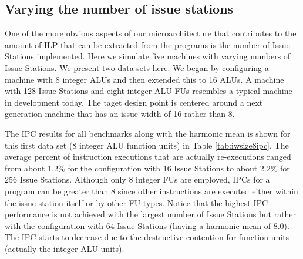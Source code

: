 %
\subsection{Varying the number of issue stations}
%
One of the more obvious aspects of our microarchitecture
that contributes to the amount of ILP
that can be extracted from the programs is the number of Issue Stations
implemented.
Here we simulate five machines with
varying numbers of Issue Stations.
We present two data sets here.  
We began by configuring a machine with  
8 integer ALUs and then extended this to 16 ALUs.
A machine  
with 128 Issue Stations and eight integer ALU FUs resembles
a typical machine in development today.
The taget design point is centered around a next generation
machine that has an issue width of 16 rather than 8.

The IPC results for all 
benchmarks along with the harmonic mean 
is shown for this first data set (8 integer ALU function units)
in Table \ref{tab:iwsize8ipc}.
The average percent of instruction executions that are 
actually re-executions ranged from about 1.2\% for the configuration
with 16 Issue Stations to about 2.2\% for 256 Issue Stations.
Although only 8 integer FUs are employed, IPCs for a program
can be greater than 8 since other instructions are executed
either within the issue station itself or by other FU types.
Notice that the highest IPC performance is not achieved with
the largest number of Issue Stations but rather with the configuration
with 64 Issue Stations (having a harmonic mean of 8.0).  
The IPC starts to decrease due to
the destructive contention for function units (actually the integer
ALU units).


